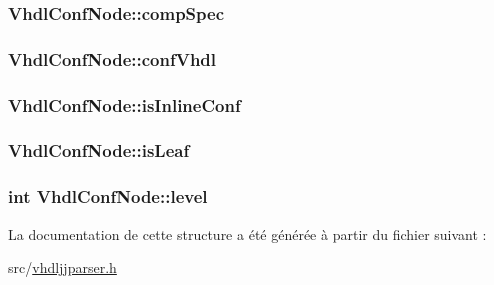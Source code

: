\subsubsection[{comp\+Spec}]{ Vhdl\+Conf\+Node\+::comp\+Spec}\label{struct_vhdl_conf_node_acec3e9f2d52721d4a229c1cbf1f5c61b}
\hypertarget{struct_vhdl_conf_node_aae66e539683b80ab09430a03f6b24aae}{}
\subsubsection[{conf\+Vhdl}]{ Vhdl\+Conf\+Node\+::conf\+Vhdl}\label{struct_vhdl_conf_node_aae66e539683b80ab09430a03f6b24aae}
\hypertarget{struct_vhdl_conf_node_ac5465303d990494eb98a12d4666ab368}{}
\subsubsection[{is\+Inline\+Conf}]{ Vhdl\+Conf\+Node\+::is\+Inline\+Conf}\label{struct_vhdl_conf_node_ac5465303d990494eb98a12d4666ab368}
\hypertarget{struct_vhdl_conf_node_a963695dba442c5aa442570969a61a3bc}{}
\subsubsection[{is\+Leaf}]{ Vhdl\+Conf\+Node\+::is\+Leaf}\label{struct_vhdl_conf_node_a963695dba442c5aa442570969a61a3bc}
\hypertarget{struct_vhdl_conf_node_a3d98980a9818f52a3753602281d19b8e}{}
\subsubsection[{level}]{\setlength{\rightskip}{0pt plus 5cm}int Vhdl\+Conf\+Node\+::level}\label{struct_vhdl_conf_node_a3d98980a9818f52a3753602281d19b8e}


La documentation de cette structure a été générée à partir du fichier suivant \+:\begin{DoxyCompactItemize}
\item 
src/\hyperlink{vhdljjparser_8h}{vhdljjparser.\+h}\end{DoxyCompactItemize}
